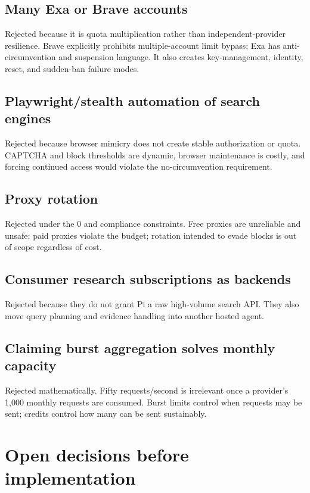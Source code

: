 \documentclass[11pt]{article}
\begin{document}
\subsection*{Many Exa or Brave accounts}
\label{sec:org0feeb72}

Rejected because it is quota multiplication rather than independent-provider
resilience.  Brave explicitly prohibits multiple-account limit bypass; Exa has
anti-circumvention and suspension language.  It also creates key-management,
identity, reset, and sudden-ban failure modes.
\subsection*{Playwright/stealth automation of search engines}
\label{sec:org9d39a15}

Rejected because browser mimicry does not create stable authorization or quota.
CAPTCHA and block thresholds are dynamic, browser maintenance is costly, and
forcing continued access would violate the no-circumvention requirement.
\subsection*{Proxy rotation}
\label{sec:org1df2b14}

Rejected under the 0 and compliance constraints.  Free proxies are unreliable
and unsafe; paid proxies violate the budget; rotation intended to evade blocks
is out of scope regardless of cost.
\subsection*{Consumer research subscriptions as backends}
\label{sec:orgf5a8af9}

Rejected because they do not grant Pi a raw high-volume search API.  They also
move query planning and evidence handling into another hosted agent.
\subsection*{Claiming burst aggregation solves monthly capacity}
\label{sec:org3238d64}

Rejected mathematically.  Fifty requests/second is irrelevant once a provider's
1,000 monthly requests are consumed.  Burst limits control when requests may be
sent; credits control how many can be sent sustainably.
\section*{Open decisions before implementation}
\label{sec:org1d29c4e}
\end{document}
